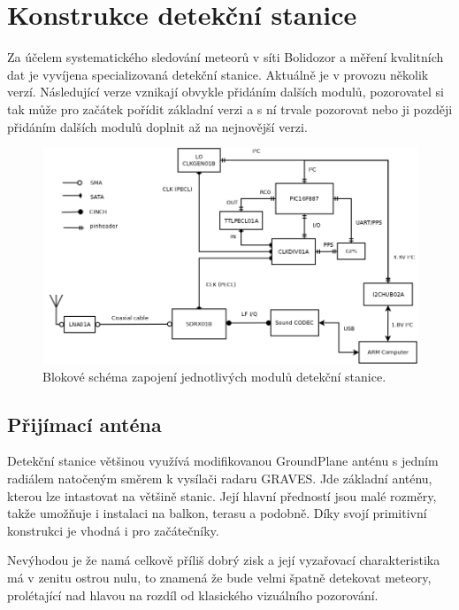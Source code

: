 \documentclass[12pt,a4paper,oneside]{article}
\begin{document}
\section{Konstrukce detekční stanice}

Za účelem systematického sledování meteorů v síti Bolidozor a měření kvalitních dat je vyvíjena specializovaná detekční stanice. Aktuálně je v provozu několik verzí. Následující verze vznikají obvykle přidáním dalších modulů, pozorovatel si tak může pro začátek pořídit základní verzi a s ní trvale pozorovat nebo ji později přidáním dalších modulů doplnit až na nejnovější verzi. 


\begin{figure}[htbp]
\begin{center}
\includegraphics [width=130mm] {../../SCH/RMDS02C_system.png} 
\end{center}
\caption{Blokové schéma zapojení jednotlivých modulů detekční stanice.}
\end{figure}


\subsection{Přijímací anténa}

Detekční stanice většinou využívá modifikovanou GroundPlane anténu s jedním radiálem natočeným směrem k vysílači radaru GRAVES. Jde základní anténu, kterou lze intastovat na většině stanic. Její hlavní předností jsou malé rozměry, takže umožňuje i instalaci na balkon, terasu a podobně. Díky svojí primitivní konstrukci je  vhodná i pro začátečníky.

Nevýhodou je že namá celkově příliš dobrý zisk a její vyzařovací charakteristika má v zenitu ostrou nulu, to znamená že bude velmi špatně detekovat meteory, prolétající nad hlavou na rozdíl od klasického vizuálního pozorování. 
\end{document}
